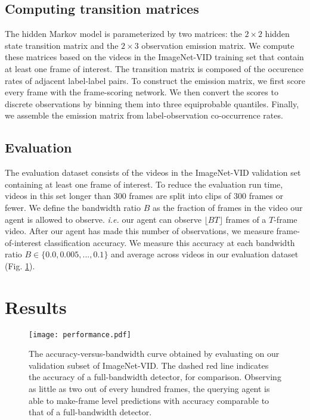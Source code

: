\documentclass[10pt,twocolumn,letterpaper]{article}
\begin{document}
\subsection{Computing transition matrices}

The hidden Markov model is parameterized by two matrices: the $2 \times 2$ hidden state transition matrix and the $2 \times 3$ observation emission matrix. We compute these matrices based on the videos in the ImageNet-VID training set that contain at least one frame of interest. The transition matrix is composed of the occurence rates of adjacent label-label pairs. To construct the emission matrix, we first score every frame with the frame-scoring network. We then convert the scores to discrete observations by binning them into three equiprobable quantiles. Finally, we assemble the emission matrix from label-observation co-occurrence rates.

\subsection{Evaluation}

The evaluation dataset consists of the videos in the ImageNet-VID validation set containing at least one frame of interest. To reduce the evaluation run time, videos in this set longer than 300 frames are split into clips of 300 frames or fewer. We define the bandwidth ratio $B$ as the fraction of frames in the video our agent is allowed to observe. \textit{i.e.} our agent can observe $\lfloor BT \rfloor$ frames of a $T$-frame video. After our agent has made this number of observations, we measure frame-of-interest classification accuracy. We measure this accuracy at each bandwidth ratio $B \in \lbrace 0.0, 0.005, ..., 0.1 \rbrace$ and average across videos in our evaluation dataset (Fig. \ref{tradeoff}).

\section{Results}



\begin{figure}[t]
\begin{center}
    \texttt{[image: performance.pdf]}
\end{center}
    \caption{The accuracy-versus-bandwidth curve obtained by evaluating on our validation subset of ImageNet-VID. The dashed red line indicates the accuracy of a full-bandwidth detector, for comparison. Observing as little as two out of every hundred frames, the querying agent is able to make-frame level predictions with accuracy comparable to that of a full-bandwidth detector.}
\label{tradeoff}
\end{figure}
\end{document}
